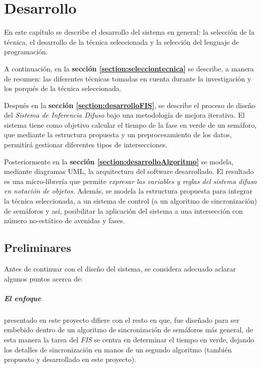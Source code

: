 \chapter{Desarrollo}

En este capítulo se describe el desarrollo del sistema en general: la selección de la técnica, el desarrollo de la técnica seleccionada y la selección del lenguaje de programación.

A continuación, en la \textbf{sección \ref{section:selecciontecnica}} se describe, a manera de resumen: las diferentes técnicas tomadas en cuenta durante la investigación y los porqués de la técnica seleccionada.

Después en la \textbf{sección \ref{section:desarrolloFIS}}, se describe el proceso de diseño del \textit{Sistema de Inferencia Difuso} bajo una metodología de mejora iterativa. El sistema tiene como objetivo calcular el tiempo de la fase en verde de un semáforo, que mediante la estructura propuesta y un preprocesamiento de los datos, permitirá gestionar diferentes tipos de intersecciones.

Posteriormente en la \textbf{sección \ref{section:desarrolloAlgoritmo}} se modela, mediante diagramas UML, la arquitectura del software desarrollado. El resultado es una micro-librería que permite \emph{expresar las variables y reglas del sistema difuso en notación de objetos}. Además, se modela la estructura propuesta para integrar la técnica seleccionada, a un sistema de control (a un algoritmo de sincronización) de semáforos y así, posibilitar la aplicación del sistema a una intersección con número no-estático de avenidas y fases.

\section{Preliminares}
Antes de continuar con el diseño del sistema, se considera adecuado aclarar algunos puntos acerca de:

\paragraph{El enfoque}presentado en este proyecto difiere con el resto en que, fue diseñado para ser embebido dentro de un algoritmo de sincronización de semáforos más general, de esta manera la tarea del \textit{FIS} se centra en determinar el tiempo en verde, dejando los detalles de sincronización en manos de un segundo algoritmo (también propuesto y desarrollado en este proyecto).

